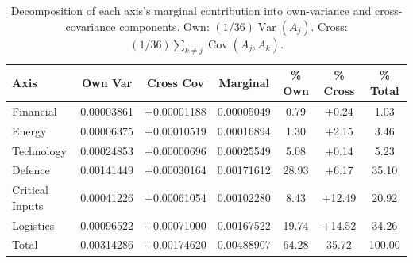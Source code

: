 \begin{table}[htbp]
\centering
\caption{Decomposition of each axis's marginal contribution into own-variance and
cross-covariance components.  Own: $(1/36)\operatorname{Var}(A_j)$.
Cross: $(1/36)\sum_{k \neq j}\operatorname{Cov}(A_j, A_k)$.}
\label{tab:variance-decomp-detail}
\small
\begin{tabular}{@{}l S[table-format=1.8] S[table-format=+1.8] S[table-format=1.8] S[table-format=2.2] S[table-format=+2.2] S[table-format=2.2]@{}}
\toprule
{\textbf{Axis}} & {\textbf{Own Var}} & {\textbf{Cross Cov}} & {\textbf{Marginal}} & {\textbf{\% Own}} & {\textbf{\% Cross}} & {\textbf{\% Total}} \\
\midrule
  Financial & 0.00003861 & +0.00001188 & 0.00005049 & 0.79 & +0.24 & 1.03 \\
  Energy & 0.00006375 & +0.00010519 & 0.00016894 & 1.30 & +2.15 & 3.46 \\
  Technology & 0.00024853 & +0.00000696 & 0.00025549 & 5.08 & +0.14 & 5.23 \\
  Defence & 0.00141449 & +0.00030164 & 0.00171612 & 28.93 & +6.17 & 35.10 \\
  Critical Inputs & 0.00041226 & +0.00061054 & 0.00102280 & 8.43 & +12.49 & 20.92 \\
  Logistics & 0.00096522 & +0.00071000 & 0.00167522 & 19.74 & +14.52 & 34.26 \\
\midrule
  Total & 0.00314286 & +0.00174620 & 0.00488907 & 64.28 & 35.72 & 100.00 \\
\bottomrule
\end{tabular}
\end{table}